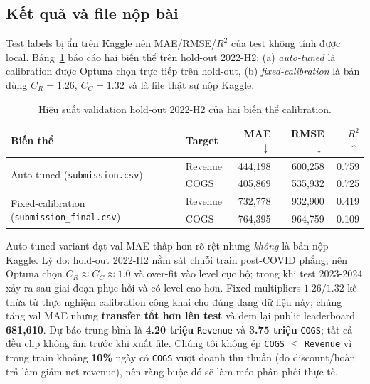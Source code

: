 \documentclass{article}
\begin{document}
\subsection{Kết quả và file nộp bài}
Test labels bị ẩn trên Kaggle nên MAE/RMSE/$R^2$ của test không tính được local. Bảng~\ref{tab:task3-validation} báo cáo hai biến thể trên hold-out 2022-H2: (a) \emph{auto-tuned} là calibration được Optuna chọn trực tiếp trên hold-out, (b) \emph{fixed-calibration} là bản dùng $C_R=1.26$, $C_C=1.32$ và là file thật sự nộp Kaggle.

\begin{table}[htbp]
    \centering
    \caption{Hiệu suất validation hold-out 2022-H2 của hai biến thể calibration.}
    \label{tab:task3-validation}
    \small
    \setlength{\tabcolsep}{4pt}
    \begin{tabular}{llrrr}
        \toprule
        Biến thể & Target & MAE $\downarrow$ & RMSE $\downarrow$ & $R^2$ $\uparrow$ \\
        \midrule
        \multirow{2}{*}{Auto-tuned (\texttt{submission.csv})}
            & Revenue & 444,198 & 600,258 & 0.759 \\
            & COGS    & 405,869 & 535,932 & 0.725 \\
        \midrule
        \multirow{2}{*}{Fixed-calibration (\texttt{submission\_final.csv})}
            & Revenue & 732,778 & 932,900 & 0.419 \\
            & COGS    & 764,395 & 964,759 & 0.109 \\
        \bottomrule
    \end{tabular}
\end{table}

Auto-tuned variant đạt val MAE thấp hơn rõ rệt nhưng \emph{không} là bản nộp Kaggle. Lý do: hold-out 2022-H2 nằm sát chuỗi train post-COVID phẳng, nên Optuna chọn $C_R \approx C_C \approx 1.0$ và over-fit vào level cục bộ; trong khi test 2023-2024 xảy ra sau giai đoạn phục hồi và có level cao hơn. Fixed multipliers $1.26 / 1.32$ kế thừa từ thực nghiệm calibration công khai cho đúng dạng dữ liệu này; chúng tăng val MAE nhưng \textbf{transfer tốt hơn lên test} và đem lại public leaderboard \textbf{681,610}. Dự báo trung bình là \textbf{4.20 triệu} \texttt{Revenue} và \textbf{3.75 triệu} \texttt{COGS}; tất cả đều clip không âm trước khi xuất file. Chúng tôi không ép \texttt{COGS} $\le$ \texttt{Revenue} vì trong train khoảng \textbf{10\%} ngày có \texttt{COGS} vượt doanh thu thuần (do discount/hoàn trả làm giảm net revenue), nên ràng buộc đó sẽ làm méo phân phối thực tế.
\end{document}
